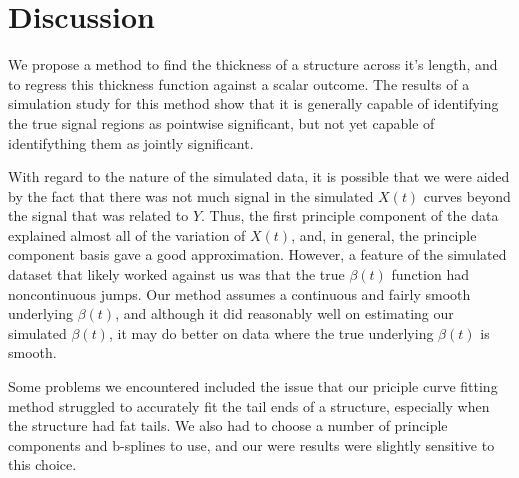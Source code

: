 \documentclass[12pt]{article}
\begin{document}
\section{Discussion}

We propose a method to find the thickness of a structure across it's length, and to regress this thickness function against a scalar outcome. The results of a simulation study for this method show that it is generally capable of identifying the true signal regions as pointwise significant, but not yet capable of identifything them as jointly significant.

With regard to the nature of the simulated data, it is possible that we were aided by the fact that there was not much signal in the simulated $X(t)$ curves beyond the signal that was related to $Y$. Thus, the first principle component of the data explained almost all of the variation of $X(t)$, and, in general, the principle component basis gave a good approximation. However, a feature of the simulated dataset that likely worked against us was that the true $\beta(t)$ function had noncontinuous jumps. Our method assumes a continuous and fairly smooth underlying $\beta(t)$, and although it did reasonably well on estimating our simulated $\beta(t)$, it may do better on data where the true underlying $\beta(t)$ is smooth.

Some problems we encountered included the issue that our priciple curve fitting method struggled to accurately fit the tail ends of a structure, especially when the structure had fat tails. We also had to choose a number of principle components and b-splines to use, and our were results were slightly sensitive to this choice.





\nocite{*}

\end{document}
